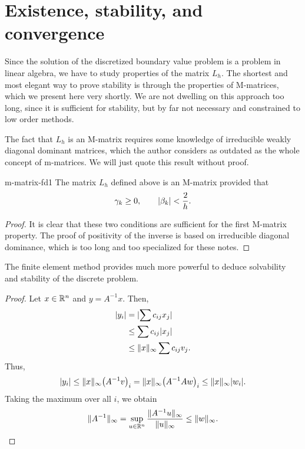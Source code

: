 \section{Existence, stability, and convergence}

\begin{intro}
  Since the solution of the discretized boundary value problem is a
  problem in linear algebra, we have to study properties of the matrix
  $L_h$. The shortest and most elegant way to prove stability is
  through the properties of M-matrices, which we present here very
  shortly. We are not dwelling on this approach too long, since it is
  sufficient for stability, but by far not necessary and constrained
  to low order methods.

  The fact that $L_h$ is an M-matrix requires some knowledge of
  irreducible weakly diagonal dominant matrices, which the author
  considers as outdated as the whole concept of m-matrices. We will
  just quote this result without proof.
\end{intro}



\begin{Lemma}{m-matrix-fd1}
  The matrix $L_h$ defined above is an M-matrix provided that
  \begin{gather}
    \label{eq:fd:3}
    \gamma_k \ge 0, %
    \qquad
    \abs{\beta_k} < \frac2h.
  \end{gather}
\end{Lemma}

\begin{proof}
  It is clear that these two conditions are sufficient for the first
  M-matrix property. The proof of positivity of the inverse is based
  on irreducible diagonal dominance, which is too long and too
  specialized for these notes.
\end{proof}

\begin{remark}
  The finite element method provides much more powerful to deduce
  solvability and stability of the discrete problem.
\end{remark}



\begin{proof}
  Let $x\in \mathbb R^n$ and $y = A^{-1} x$. Then,
  \begin{align*}
    \lvert y_i\rvert & = \lvert\sum c_{ij} x_j\rvert \\
    & \le \sum c_{ij} \lvert x_j\rvert \\
    & \le \lVert x\rVert_\infty \sum c_{ij} v_j.
  \end{align*}
  Thus,
  \begin{gather*}
    \lvert y_i\rvert \le  \lVert x\rVert_\infty \bigl(A^{-1} v\bigr)_i
    = \lVert x\rVert_\infty \bigl(A^{-1} Aw\bigr)_i \le \lVert x\rVert_\infty \lvert w_i\rvert.
  \end{gather*}
  Taking the maximum over all $i$, we obtain
  \begin{gather*}
    \lVert A^{-1}\rVert_\infty = \sup_{u\in
      \mathbb R^n}\frac{\lVert A^{-1}u\rVert_\infty}{\lVert u\rVert_\infty}
    \le \lVert w\rVert_\infty.
  \end{gather*}
\end{proof}

